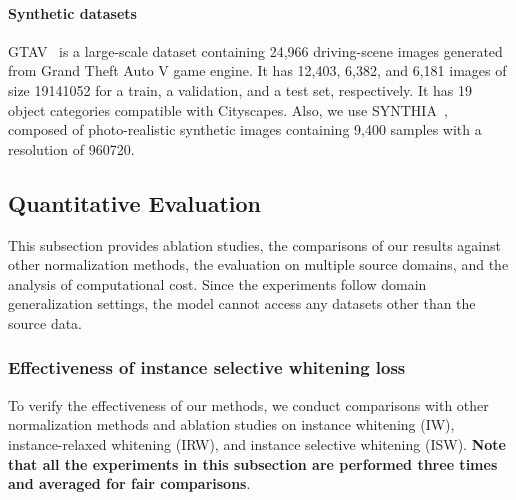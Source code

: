 \documentclass[final]{latex/cvpr}
\begin{document}
\vspace{-0.48cm}
\paragraph{Synthetic datasets} GTAV~\cite{Richter_2016_ECCV} is a large-scale dataset containing 24,966 driving-scene images generated from Grand Theft Auto V game engine. It has 12,403, 6,382, and 6,181 images of size 19141052 for a train, a validation, and a test set, respectively. It has 19 object categories compatible with Cityscapes.
Also, we use SYNTHIA~\cite{ros2016synthia}, composed of photo-realistic synthetic images containing 9,400 samples with a resolution of 960720. 


\vspace{-0.1cm}
\subsection{Quantitative Evaluation}
\vspace{-0.1cm}
This subsection provides ablation studies, the comparisons of our results against other normalization methods, the evaluation on multiple source domains, and the analysis of computational cost. Since the experiments follow domain generalization settings, the model cannot access any datasets other than the source data.
\vspace{-0.38cm}
\subsubsection{Effectiveness of instance selective whitening loss}\label{exp:effectiveness}
\vspace{-0.17cm}
To verify the effectiveness of our methods, we conduct comparisons with other normalization methods and ablation studies on instance whitening (IW), instance-relaxed whitening (IRW), and instance selective whitening (ISW).
\textbf{Note that all the experiments in this subsection are performed three times and averaged for fair comparisons}. 
\end{document}
